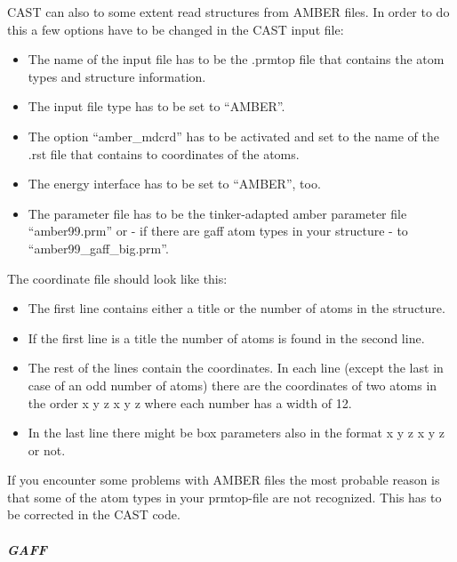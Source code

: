 \documentclass[10pt,a4paper]{article} %
\begin{document}
\ac{CAST} can also to some extent read structures from \ac{AMBER} files. In order to do this a few options have to be changed in the CAST input file:
\begin{itemize}
\item The name of the input file has to be the .prmtop file that contains the atom types and structure information.
\item The input file type has to be set to ``AMBER''.
\item The option ``amber\_mdcrd'' has to be activated and set to the name of the .rst file that contains to coordinates of the atoms.
\item The energy interface has to be set to ``AMBER'', too.
\item The parameter file has to be the tinker-adapted amber parameter file ``amber99.prm'' or - if there are gaff atom types in your structure - to ``amber99\_gaff\_big.prm''.
\end{itemize}

The coordinate file should look like this:
\begin{itemize}
\item The first line contains either a title or the number of atoms in the structure.
\item If the first line is a title the number of atoms is found in the second line.
\item The rest of the lines contain the coordinates. In each line (except the last in case of an odd number of atoms) there are the coordinates of two atoms in the order x y z x y z where each number has a width of 12.
\item In the last line there might be box parameters also in the format x y z x y z or not.
\end{itemize}

If you encounter some problems with \ac{AMBER} files the most probable reason is that some of the atom types in your prmtop-file are not recognized. This has to be corrected in the \ac{CAST} code.

\paragraph{\textit{GAFF}}
\end{document}
